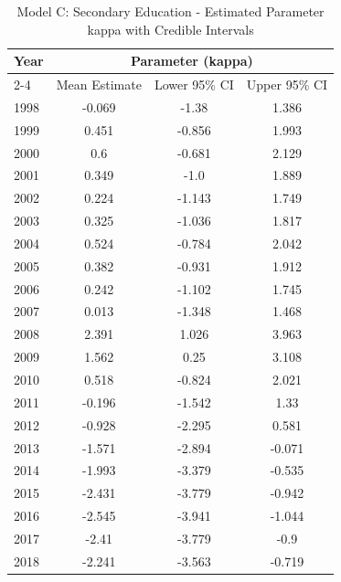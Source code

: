\begin{landscape}
\begin{table}[htbp]
\centering
\caption{Model C: Secondary Education - Estimated Parameter kappa  with Credible Intervals}
\label{tab:Fparameters_k11}
\begin{tabular}{@{}lccc@{}}
\toprule
Year & \multicolumn{3}{c}{Parameter (kappa)} \\
\cmidrule(lr){2-4}
      & Mean Estimate & Lower 95\% CI & Upper 95\% CI \\
\midrule
1998 & -0.069 & -1.38 & 1.386 \\
1999 & 0.451 & -0.856 & 1.993 \\
2000 & 0.6 & -0.681 & 2.129 \\
2001 & 0.349 & -1.0 & 1.889 \\
2002 & 0.224 & -1.143 & 1.749 \\
2003 & 0.325 & -1.036 & 1.817 \\
2004 & 0.524 & -0.784 & 2.042 \\
2005 & 0.382 & -0.931 & 1.912 \\
2006 & 0.242 & -1.102 & 1.745 \\
2007 & 0.013 & -1.348 & 1.468 \\
2008 & 2.391 & 1.026 & 3.963 \\
2009 & 1.562 & 0.25 & 3.108 \\
2010 & 0.518 & -0.824 & 2.021 \\
2011 & -0.196 & -1.542 & 1.33 \\
2012 & -0.928 & -2.295 & 0.581 \\
2013 & -1.571 & -2.894 & -0.071 \\
2014 & -1.993 & -3.379 & -0.535 \\
2015 & -2.431 & -3.779 & -0.942 \\
2016 & -2.545 & -3.941 & -1.044 \\
2017 & -2.41 & -3.779 & -0.9 \\
2018 & -2.241 & -3.563 & -0.719 \\
\bottomrule
\end{tabular}
\end{table}
\end{landscape}